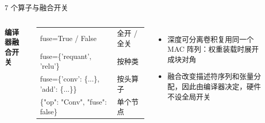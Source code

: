 \documentclass[10pt,aspectratio=169,hyperref={colorlinks,urlcolor=peking_blue,linkcolor=}]{beamer}
\begin{document}
\begin{frame}{7 个算子与融合开关}
  \vspace{6pt}

  \begin{columns}[T]
    \textbf{编译器融合开关}\\[3pt]
    {\scriptsize\ttfamily
    \begin{tabular}{@{}l l@{}}
      fuse=True / False & \rmfamily 全开 / 全关 \\
      fuse=\{'requant', 'relu'\} & \rmfamily 按种类 \\
      fuse=\{'conv': \{...\}, 'add': \{...\}\} & \rmfamily 按头算子 \\
      \{"op": "Conv", "fuse": false\} & \rmfamily 单个节点 \\
    \end{tabular}}
    \begin{itemize}\small
      \item 深度可分离卷积复用同一个 MAC 阵列：权重装载时展开成块对角
      \item 融合改变描述符序列和张量分配，因此由编译器决定，硬件不设全局开关
    \end{itemize}
  \end{columns}
\end{frame}
\end{document}
